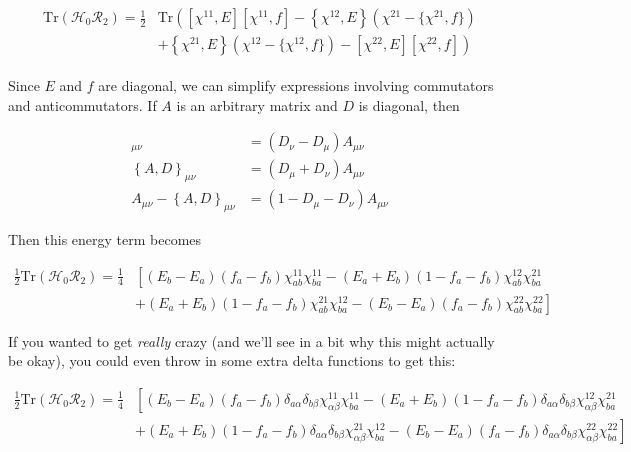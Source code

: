 \begin{align}\label{eqn:H0R2}
\begin{aligned}
\mathrm{Tr}\left(\mathcal{H}_0\mathcal{R}_2\right) = \frac{1}{2}&\mathrm{Tr} \left([\chi^{11},E][\chi^{11},f] - \left\{\chi^{12},E\right\}(\chi^{21}-\{\chi^{21},f\})\right. \\
&\left.+ \left\{\chi^{21},E\right\}(\chi^{12}-\{\chi^{12},f\}) - [\chi^{22},E][\chi^{22},f]\right)
\end{aligned}
\end{align}

Since $E$ and $f$ are diagonal, we can simplify expressions involving commutators and anticommutators. If $A$ is an arbitrary matrix and $D$ is diagonal, then

\begin{align*}
[A,D]_{\mu\nu} &= (D_\nu-D_\mu)A_{\mu\nu} \\
\left\{A,D\right\}_{\mu\nu} &= (D_\mu+D_\nu)A_{\mu\nu} \\
A_{\mu\nu}-\left\{A,D\right\}_{\mu\nu} &= (1-D_\mu-D_\nu)A_{\mu\nu}
\end{align*}

\noindent Then this energy term becomes

\begin{align*}
\frac{1}{2}\mathrm{Tr}\left(\mathcal{H}_0\mathcal{R}_2\right) = \frac{1}{4}& \left[(E_b-E_a)(f_a-f_b)\chi^{11}_{ab}\chi^{11}_{ba} - (E_a+E_b)(1-f_a-f_b)\chi^{12}_{ab}\chi^{21}_{ba}\right. \\
&\left.+ (E_a+E_b)(1-f_a-f_b)\chi^{21}_{ab}\chi^{12}_{ba} - (E_b-E_a)(f_a-f_b)\chi^{22}_{ab}\chi^{22}_{ba}\right]
\end{align*}

\noindent If you wanted to get \textit{really} crazy (and we'll see in a bit why this might actually be okay), you could even throw in some extra delta functions to get this:

\begin{align*}
\frac{1}{2}\mathrm{Tr}\left(\mathcal{H}_0\mathcal{R}_2\right) = \frac{1}{4}& \left[(E_b-E_a)(f_a-f_b)\delta_{a\alpha}\delta_{b\beta}\chi^{11}_{\alpha\beta}\chi^{11}_{ba} - (E_a+E_b)(1-f_a-f_b)\delta_{a\alpha}\delta_{b\beta}\chi^{12}_{\alpha\beta}\chi^{21}_{ba}\right. \\
&\left.+ (E_a+E_b)(1-f_a-f_b)\delta_{a\alpha}\delta_{b\beta}\chi^{21}_{\alpha\beta}\chi^{12}_{ba} - (E_b-E_a)(f_a-f_b)\delta_{a\alpha}\delta_{b\beta}\chi^{22}_{\alpha\beta}\chi^{22}_{ba}\right]
\end{align*}

